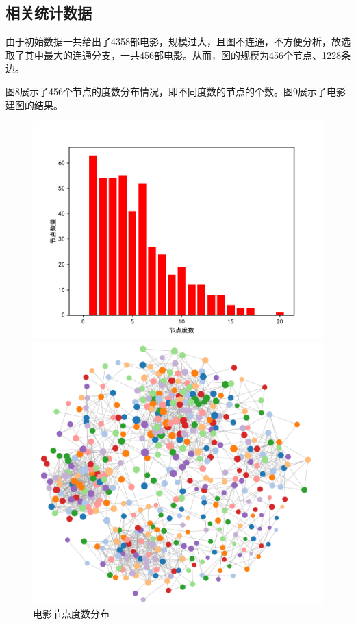 \documentclass[UTF8, onecolumn, a4paper]{article}
\begin{document}
\subsection{相关统计数据}
    由于初始数据一共给出了4358部电影，规模过大，且图不连通，不方便分析，故选取了其中最大的连通分支，一共456部电影。从而，图的规模为456个节点、1228条边。
    
    图8展示了456个节点的度数分布情况，即不同度数的节点的个数。图9展示了电影建图的结果。
\begin{center}
    \begin{figure}[ht] %
    \centering %
    \begin{minipage}[b]{0.95\linewidth} %
    	\begin{minipage}[b]{0.47\linewidth} %
    	\centering
    	\includegraphics[width=\linewidth]{../pictures/movie_degree}
    	\caption{电影节点度数分布}
    	\end{minipage}
    	\hfill
    	\begin{minipage}[b]{0.46\linewidth}
    	\centering
    	\includegraphics[width=\linewidth]{../pictures/show7}

\end{minipage}
\end{minipage}
\end{figure}
\end{center}
\end{document}
